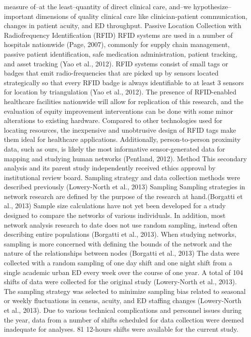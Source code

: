 \documentclass[]{elsarticle} %
\begin{document}
measure of--at the least--quantity of direct clinical care, and--we
hypothesize--important dimensions of quality clinical care like
clinician-patient communication, changes in patient acuity, and ED
throughput. Passive Location Collection with Radiofrequency
Identification (RFID) RFID systems are used in a number of hospitals
nationwide (Page, 2007), commonly for supply chain management, passive
patient identification, safe medication administration, patient
tracking, and asset tracking (Yao et al., 2012). RFID systems consist of
small tags or badges that emit radio-frequencies that are picked up by
sensors located strategically so that every RFID badge is always
identifiable to at least 3 sensors for location by triangulation (Yao et
al., 2012). The presence of RFID-enabled healthcare facilities
nationwide will allow for replication of this research, and the
evaluation of equity improvement interventions can be done with some
minor alterations to existing hardware. Compared to other technologies
used for locating resources, the inexpensive and unobtrusive design of
RFID tags make them ideal for healthcare applications. Additionally,
person-to-person proximity data, such as ours, is likely the most
informative sensor-generated data for mapping and studying human
networks (Pentland, 2012). Method This secondary analysis and its parent
study independently received ethics approval by institutional review
board. Sampling strategy and data collection methods were described
previously (Lowery-North et al., 2013) Sampling Sampling strategies in
network research are defined by the purpose of the research at
hand.(Borgatti et al., 2013) Sample size calculations have not yet been
developed for a study designed to compare the networks of various
individuals. In addition, most network analysis research to date does
not use random sampling, instead often describing entire populations
(Borgatti et al., 2013). When studying networks, sampling is more
concerned with defining the bounds of the network and the nature of the
relationships between nodes (Borgatti et al., 2013) The data were
collected with a random sampling of one day shift and one night shift
from a single academic urban ED every week over the course of one year.
A total of 104 shifts of data were collected for the original study
(Lowery-North et al., 2013). The sampling strategy was selected to
minimize sampling bias related to seasonal or weekly fluctuations in
census, acuity, and ED staffing changes (Lowery-North et al., 2013). Due
to various technical complications and personnel issues during the year,
data from a number of shifts scheduled for data collection were deemed
inadequate for analyses. 81 12-hours shifts were available for the
current study.
\end{document}
